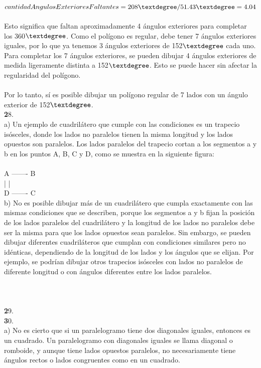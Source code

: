 \documentclass{article}
\begin{document}
\\
$cantidadAngulosExterioresFaltantes = 208\textdegree / 51.43\textdegree = 4.04$\\
\\
Esto significa que faltan aproximadamente 4 ángulos exteriores para completar los 360$\textdegree$. Como el polígono es regular, debe tener 7 ángulos exteriores iguales, por lo que ya tenemos 3 ángulos exteriores de 152$\textdegree$ cada uno. Para completar los 7 ángulos exteriores, se pueden dibujar 4 ángulos exteriores de medida ligeramente distinta a 152$\textdegree$. Esto se puede hacer sin afectar la regularidad del polígono.\\
\\
Por lo tanto, sí es posible dibujar un polígono regular de 7 lados con un ángulo exterior de 152$\textdegree$.\\
{\textbf 28. }\\
a) Un ejemplo de cuadrilátero que cumple con las condiciones es un trapecio isósceles, donde los lados no paralelos tienen la misma longitud y los lados opuestos son paralelos. Los lados paralelos del trapecio cortan a los segmentos a y b en los puntos A, B, C y D, como se muestra en la siguiente figura:\\
\\
A ------- B\\
|         |\\
D ------- C\\
b) No es posible dibujar más de un cuadrilátero que cumpla exactamente con las mismas condiciones que se describen, porque los segmentos a y b fijan la posición de los lados paralelos del cuadrilátero y la longitud de los lados no paralelos debe ser la misma para que los lados opuestos sean paralelos. Sin embargo, se pueden dibujar diferentes cuadriláteros que cumplan con condiciones similares pero no idénticas, dependiendo de la longitud de los lados y los ángulos que se elijan. Por ejemplo, se podrían dibujar otros trapecios isósceles con lados no paralelos de diferente longitud o con ángulos diferentes entre los lados paralelos.\\
\\
\\
\\
{\textbf 29. }\\
{\textbf 30. }\\
a) No es cierto que si un paralelogramo tiene dos diagonales iguales, entonces es un cuadrado. Un paralelogramo con diagonales iguales se llama diagonal o romboide, y aunque tiene lados opuestos paralelos, no necesariamente tiene ángulos rectos o lados congruentes como en un cuadrado.\\
\end{document}
